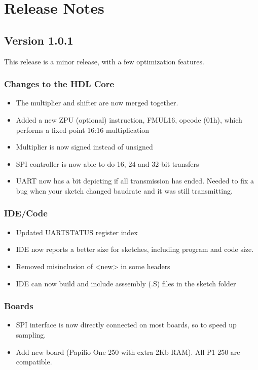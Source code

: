 \chapter{Release Notes}

\section{Version 1.0.1}

This release is a minor release, with a few optimization features.

\subsection*{Changes to the HDL Core}
\begin{itemize}
\item The multiplier and shifter are now merged together.
\item Added a new ZPU (optional) instruction, FMUL16, opcode (01h), which performs a fixed-point 16:16 multiplication
\item Multiplier is now signed instead of unsigned
\item SPI controller is now able to do 16, 24 and 32-bit transfers
\item UART now has a bit depicting if all transmission has ended. Needed to fix a bug when your sketch changed baudrate and it was still transmitting.
\end{itemize}

\subsection*{IDE/Code}
\begin{itemize}
\item Updated UARTSTATUS register index
\item IDE now reports a better size for sketches, including program and code size.
\item Removed misinclusion of <new> in some headers
\item IDE can now build and include asssembly (.S) files in the sketch folder
\end{itemize}

\subsection*{Boards}
\begin{itemize}
\item SPI interface is now directly connected on most boards, so to speed up sampling.
\item Add new board (Papilio One 250 with extra 2Kb RAM). All P1 250 are compatible.
\end{itemize}

